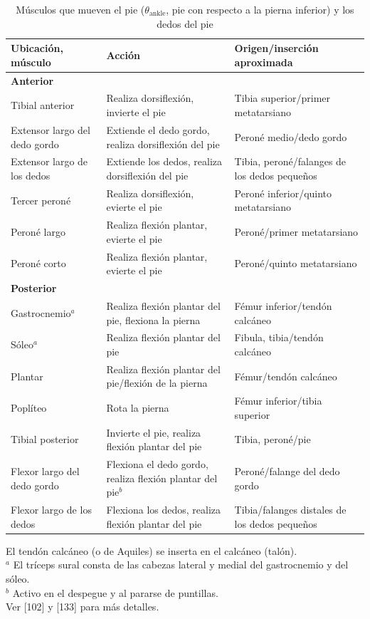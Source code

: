 \documentclass[12pt]{book}
\begin{document}
\begin{table}[htbp]
\centering
\caption{Músculos que mueven el pie ($\theta_{\text{ankle}}$, pie con respecto a la pierna inferior) y los dedos del pie}
\label{tab:33}
\begin{tabularx}{\textwidth}{XXX}
\toprule
\textbf{Ubicación, músculo} & \textbf{Acción} & \textbf{Origen/inserción aproximada} \\
\midrule
\textbf{Anterior} & & \\
Tibial anterior & Realiza dorsiflexión, invierte el pie & Tibia superior/primer metatarsiano \\
Extensor largo del dedo gordo & Extiende el dedo gordo, realiza dorsiflexión del pie & Peroné medio/dedo gordo \\
Extensor largo de los dedos & Extiende los dedos, realiza dorsiflexión del pie & Tibia, peroné/falanges de los dedos pequeños \\
Tercer peroné & Realiza dorsiflexión, evierte el pie & Peroné inferior/quinto metatarsiano \\
Peroné largo & Realiza flexión plantar, evierte el pie & Peroné/primer metatarsiano \\
Peroné corto & Realiza flexión plantar, evierte el pie & Peroné/quinto metatarsiano \\
\midrule
\textbf{Posterior} & & \\
Gastrocnemio$^a$ & Realiza flexión plantar del pie, flexiona la pierna & Fémur inferior/tendón calcáneo \\
Sóleo$^a$ & Realiza flexión plantar del pie & Fibula, tibia/tendón calcáneo \\
Plantar & Realiza flexión plantar del pie/flexión de la pierna & Fémur/tendón calcáneo \\
Poplíteo & Rota la pierna & Fémur inferior/tibia superior \\
Tibial posterior & Invierte el pie, realiza flexión plantar del pie & Tibia, peroné/pie \\
Flexor largo del dedo gordo & Flexiona el dedo gordo, realiza flexión plantar del pie$^b$ & Peroné/falange del dedo gordo \\
Flexor largo de los dedos & Flexiona los dedos, realiza flexión plantar del pie & Tibia/falanges distales de los dedos pequeños \\
\bottomrule
\end{tabularx}
\begin{flushleft}
    \small El tendón calcáneo (o de Aquiles) se inserta en el calcáneo (talón). \\
    $^a$ El tríceps sural consta de las cabezas lateral y medial del gastrocnemio y del sóleo. \\
    $^b$ Activo en el despegue y al pararse de puntillas. \\
    Ver [102] y [133] para más detalles.
\end{flushleft}
\end{table}
\end{document}
